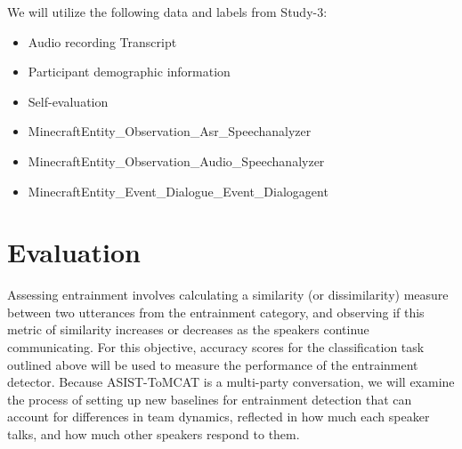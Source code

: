     We will utilize the following data and labels from Study-3:
            \begin{itemize}               
                   \item Audio recording
                    Transcript
                   \item Participant demographic information
                   \item Self-evaluation
                   \item MinecraftEntity\_Observation\_Asr\_Speechanalyzer
                   \item MinecraftEntity\_Observation\_Audio\_Speechanalyzer
                   \item MinecraftEntity\_Event\_Dialogue\_Event\_Dialogagent
            \end{itemize}

\section{Evaluation}

    Assessing entrainment involves calculating a similarity (or dissimilarity) measure between two utterances from the entrainment category, and observing if this metric of similarity increases or decreases as the speakers continue communicating. For this objective, accuracy scores for the classification task outlined above will be used to measure the performance of the entrainment detector. Because ASIST-ToMCAT is a multi-party conversation, we will examine the process of setting up new baselines for entrainment detection that can account for differences in team dynamics, reflected in how much each speaker talks, and how much other speakers respond to them.  


